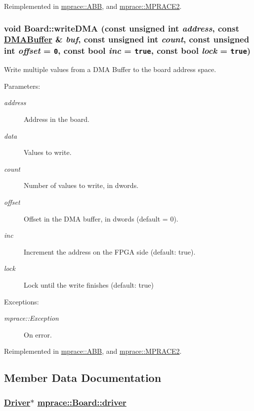 Reimplemented in \hyperlink{classmprace_1_1ABB_a6}{mprace::ABB}, and \hyperlink{classmprace_1_1MPRACE2_a4}{mprace::MPRACE2}.\hypertarget{classmprace_1_1Board_a7}{
\subsubsection[writeDMA]{\setlength{\rightskip}{0pt plus 5cm}void Board::write\-DMA (const unsigned int {\em address}, const \hyperlink{classmprace_1_1DMABuffer}{DMABuffer} \& {\em buf}, const unsigned int {\em count}, const unsigned int {\em offset} = {\tt 0}, const bool {\em inc} = {\tt true}, const bool {\em lock} = {\tt true})}}
\label{classmprace_1_1Board_a7}


Write multiple values from a DMA Buffer to the board address space. 

\begin{Desc}
\item[Parameters:]
\begin{description}
\item[{\em address}]Address in the board. \item[{\em data}]Values to write. \item[{\em count}]Number of values to write, in dwords. \item[{\em offset}]Offset in the DMA buffer, in dwords (default = 0). \item[{\em inc}]Increment the address on the FPGA side (default: true). \item[{\em lock}]Lock until the write finishes (default: true) \end{description}
\end{Desc}
\begin{Desc}
\item[Exceptions:]
\begin{description}
\item[{\em mprace::Exception}]On error.\end{description}
\end{Desc}


Reimplemented in \hyperlink{classmprace_1_1ABB_a8}{mprace::ABB}, and \hyperlink{classmprace_1_1MPRACE2_a6}{mprace::MPRACE2}.

\subsection{Member Data Documentation}
\hypertarget{classmprace_1_1Board_p1}{
\subsubsection[driver]{\setlength{\rightskip}{0pt plus 5cm}\hyperlink{classmprace_1_1Driver}{Driver}$\ast$ \hyperlink{classmprace_1_1Board_p1}{mprace::Board::driver}}}
\label{classmprace_1_1Board_p1}


